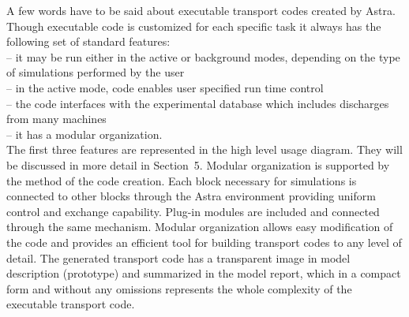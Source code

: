 A few words have to be said about executable transport codes created by
Astra.
Though executable code is customized for each specific task it always
has the following set of standard features:\\
\hspace*{5mm} -- it may be run either in the active or background
		modes, depending on the type of \linebreak
		\hspace*{9mm} simulations performed by the user\\ 
\hspace*{5mm} -- in the active mode, code enables user specified 
			run time control\\ 
\hspace*{5mm} -- the code interfaces with the experimental database 
			which includes discharges from %
			\hspace*{9mm} many machines\\ 
\hspace*{5mm} -- it has a modular organization.\\
The first three features are represented in the high level usage diagram.
They will be discussed in more detail in Section~5.
Modular organization is supported by the method of the code creation.
Each block necessary for simulations is connected to other blocks
through the Astra environment providing uniform control and exchange
capability. 
Plug-in modules are included and connected through the same mechanism.
Modular organization allows easy modification of the code and provides
an efficient tool for building transport codes to any level of detail. 
The generated transport code has a transparent image in model
description (prototype) and summarized in the model report, 
which in a compact form and without any omissions 
represents the whole complexity of the executable transport code.

